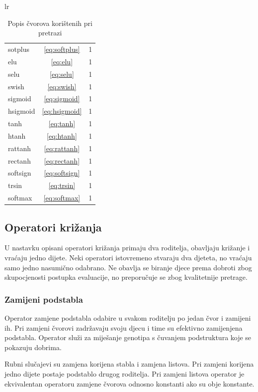 \documentclass[times, utf8, numeric, diplomski]{fer}
\begin{document}
\begin{table}[H]
\begin{tabular}[t]{lr}
\begin{tabular}[t]{l|c|r}
sotplus	& \eqref{eq:softplus}	& 1 \\
elu		& \eqref{eq:elu}			& 1 \\
selu		& \eqref{eq:selu}		& 1 \\
swish	& \eqref{eq:swish}		& 1 \\
sigmoid	& \eqref{eq:sigmoid}		& 1 \\
hsigmoid & \eqref{eq:hsigmoid}	& 1 \\
tanh		& \eqref{eq:tanh}		& 1 \\
htanh 	& \eqref{eq:htanh}		& 1 \\
rattanh & \eqref{eq:rattanh}		& 1 \\
rectanh & \eqref{eq:rectanh}		& 1 \\
softsign	& \eqref{eq:softsign}	& 1 \\
trsin 	& \eqref{eq:trsin}		& 1 \\
softmax	& \eqref{eq:softmax}		& 1 \\
\end{tabular}
\end{tabular}
\caption{Popis čvorova korištenih pri pretrazi}
\end{table}


\subsection{Operatori križanja}
U nastavku opisani operatori križanja primaju dva roditelja, obavljaju križanje i vraćaju jedno dijete. Neki operatori istovremeno stvaraju dva djeteta, no vraćaju samo jedno nasumično odabrano. Ne obavlja se biranje djece prema dobroti zbog skupocjenosti postupka evaluacije, no preporučuje se zbog kvalitetnije pretrage.

\subsubsection{Zamijeni podstabla}
Operator zamjene podstabla odabire u svakom roditelju po jedan čvor i zamijeni ih. Pri zamjeni čvorovi zadržavaju svoju djecu i time su efektivno zamijenjena podstabla. Operator služi za miješanje genotipa s čuvanjem podstruktura koje se pokazuju dobrima. %

Rubni slučajevi su zamjena korijena stabla i zamjena listova. Pri zamjeni korijena jedno dijete postaje podstablo drugog roditelja. Pri zamjeni listova operator je ekvivalentan operatoru zamjene čvorova odnosno konstanti ako su obje konstante.
\end{document}
